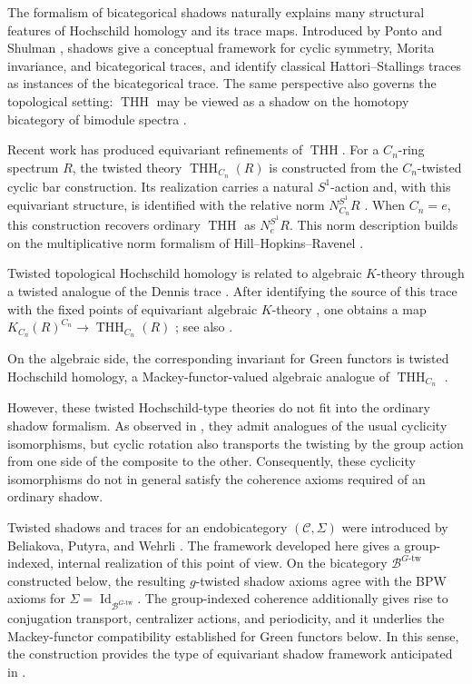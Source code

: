\documentclass[11pt,oneside]{amsart}
\DeclareMathOperator{\THH}{THH}
\numberwithin{equation}{section}
\numberwithin{figure}{section}
\theoremstyle{plain}
\theoremstyle{definition}
\theoremstyle{remark}
\begin{document}
The formalism of bicategorical shadows naturally explains many structural features of Hochschild homology and its trace maps. Introduced by Ponto and Shulman \cite{PONSH}, shadows give a conceptual framework for cyclic symmetry, Morita invariance, and bicategorical traces, and identify classical Hattori--Stallings traces as instances of the bicategorical trace. The same perspective also governs the topological setting: \(\THH\) may be viewed as a shadow on the homotopy bicategory of bimodule spectra \cite{CP}.





Recent work has produced equivariant refinements of \(\THH\).
For a \(C_n\)-ring spectrum \(R\), the twisted theory
\(\THH_{C_n}(R)\) is constructed from the \(C_n\)-twisted cyclic bar
construction. Its realization carries a natural \(S^1\)-action and,
with this equivariant structure, is identified with the relative norm
\(
N_{C_n}^{S^1}R
\)
\cite{ABGHLM}. When \(C_n=e\), this construction recovers ordinary
\(\THH\) as \(N_e^{S^1}R\). This norm description builds on the
multiplicative norm formalism of Hill--Hopkins--Ravenel \cite{HHR}.

Twisted topological Hochschild homology is related to  
algebraic \(K\)-theory through a twisted analogue of the Dennis trace
\cite[Section~6.1]{AGHKK}. After identifying the source of this trace with the
fixed points of equivariant algebraic \(K\)-theory \cite{Merling2017,MM}, one obtains a map
\(
K_{C_n}(R)^{C_n}
\to
\THH_{C_n}(R)
\)
\cite[Section~6.2]{AGHKK}; see also
\cite{CGK25}.

On the algebraic side, the corresponding invariant for Green
functors is twisted Hochschild homology, a
Mackey-functor-valued algebraic analogue of
\(\THH_{C_n}\) \cite{BGHL}.

However, these twisted Hochschild-type theories do not fit into the
ordinary shadow formalism. As observed in
\cite[Remarks~4.1.6 and~4.2.6]{AGHKK}, they admit analogues of the
usual cyclicity isomorphisms, but cyclic rotation also transports the
twisting by the group action from one side of the composite to the
other. Consequently, these cyclicity isomorphisms do not in general
satisfy the coherence axioms required of an ordinary shadow.

Twisted shadows and traces for an endobicategory
\((\mathcal C,\Sigma)\) were introduced by Beliakova, Putyra, and
Wehrli \cite{BPW}. The framework developed here gives a
group-indexed, internal realization of this point of view. On the
bicategory \(\mathcal B^{G\text{-tw}}\) constructed below, the resulting
\(g\)-twisted shadow axioms agree with the BPW axioms for
\(\Sigma=\operatorname{Id}_{\mathcal B^{G\text{-tw}}}\). The
group-indexed coherence additionally gives rise to conjugation
transport, centralizer actions, and periodicity, and it underlies the
Mackey-functor compatibility established for Green functors below. In
this sense, the construction provides the type of equivariant shadow
framework anticipated in
\cite[Remarks~4.1.6 and~4.2.6]{AGHKK}.
\end{document}
